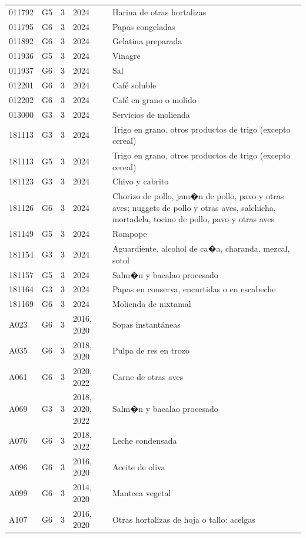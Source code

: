 \begin{table}[ht]
\begin{tabular}{llrll}
  011792 & G5 &   3 & 2024 & Harina de otras hortalizas \\ 
  011795 & G6 &   3 & 2024 & Papas congeladas \\ 
  011892 & G6 &   3 & 2024 & Gelatina preparada \\ 
  011936 & G5 &   3 & 2024 & Vinagre \\ 
  011937 & G6 &   3 & 2024 & Sal \\ 
  012201 & G6 &   3 & 2024 & Café soluble \\ 
  012202 & G6 &   3 & 2024 & Café en grano o molido \\ 
  013000 & G3 &   3 & 2024 & Servicios de molienda \\ 
  181113 & G3 &   3 & 2024 & Trigo en grano, otros productos de trigo (excepto cereal) \\ 
  181113 & G5 &   3 & 2024 & Trigo en grano, otros productos de trigo (excepto cereal) \\ 
  181123 & G3 &   3 & 2024 & Chivo y cabrito \\ 
  181126 & G6 &   3 & 2024 & Chorizo de pollo, jam�n de pollo, pavo y otras aves; nuggets de pollo y otras aves, salchicha, mortadela, tocino de pollo, pavo y otras aves \\ 
  181149 & G5 &   3 & 2024 & Rompope \\ 
  181154 & G3 &   3 & 2024 & Aguardiente, alcohol de ca�a, charanda, mezcal, sotol \\ 
  181157 & G5 &   3 & 2024 & Salm�n y bacalao procesado \\ 
  181164 & G3 &   3 & 2024 & Papas en conserva, encurtidas o en escabeche \\ 
  181169 & G6 &   3 & 2024 & Molienda de nixtamal \\ 
  A023 & G6 &   3 & 2016, 2020 & Sopas instantáneas \\ 
  A035 & G6 &   3 & 2018, 2020 & Pulpa de res en trozo \\ 
  A061 & G6 &   3 & 2020, 2022 & Carne de otras aves \\ 
  A069 & G3 &   3 & 2018, 2020, 2022 & Salm�n y bacalao procesado \\ 
  A076 & G6 &   3 & 2018, 2022 & Leche condensada \\ 
  A096 & G6 &   3 & 2016, 2020 & Aceite de oliva \\ 
  A099 & G6 &   3 & 2014, 2020 & Manteca vegetal \\ 
  A107 & G6 &   3 & 2016, 2020 & Otras hortalizas de hoja o tallo: acelgas \\ 

\end{tabular}
\end{table}
